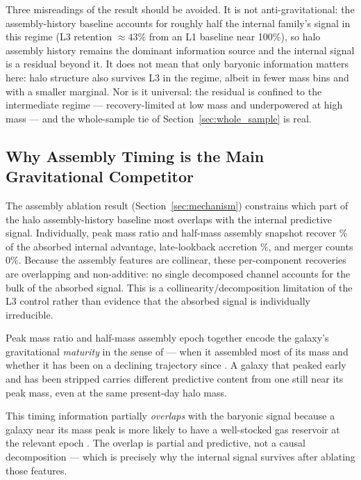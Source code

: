 \documentclass[twocolumn,linenumbers]{aastex701}
\begin{document}
Three misreadings of the result should be avoided.
It is not anti-gravitational: the assembly-history baseline accounts for
roughly half the internal family's signal in this regime (L3 retention
$\approx 43\%$ from an L1 baseline near 100\%), so halo assembly history
remains the dominant information source and the internal signal is a residual
beyond it.
It does not mean that only baryonic information matters here: halo structure
also survives L3 in the regime, albeit in fewer mass bins and with a smaller
marginal.
Nor is it universal: the residual is confined to the intermediate regime ---
recovery-limited at low mass and underpowered at high mass --- and the
whole-sample tie of Section~\ref{sec:whole_sample} is real.

\subsection{Why Assembly Timing is the Main Gravitational Competitor}

The assembly ablation result (Section~\ref{sec:mechanism}) constrains which
part of the halo assembly-history baseline most overlaps with the internal
predictive signal.
Individually, peak mass ratio and half-mass assembly snapshot recover
\AblationTimingPct\% of the absorbed internal advantage, late-lookback accretion
\AblationLongAccretionPct\%, and merger counts 0\%.
Because the assembly features are collinear, these per-component recoveries are
overlapping and non-additive: no single decomposed channel accounts for the bulk of
the absorbed signal. This is a collinearity/decomposition limitation of the L3
control rather than evidence that the absorbed signal is individually irreducible.

Peak mass ratio and half-mass assembly epoch together encode the galaxy's
gravitational \textit{maturity} in the sense of \citet{lacey1993} ---
when it assembled most of its mass and whether it has been on a declining
trajectory since \citep{wechsler2006,mao2018}.
A galaxy that peaked early and has been stripped carries different
predictive content from one still near its peak mass, even at the same
present-day halo mass.

This timing information partially \textit{overlaps} with the baryonic signal
because a galaxy near its mass peak is more likely to have a well-stocked
gas reservoir at the relevant epoch \citep{saintonge2017}.
The overlap is partial and predictive, not a causal decomposition --- which
is precisely why the internal signal survives after ablating those features.
\end{document}
